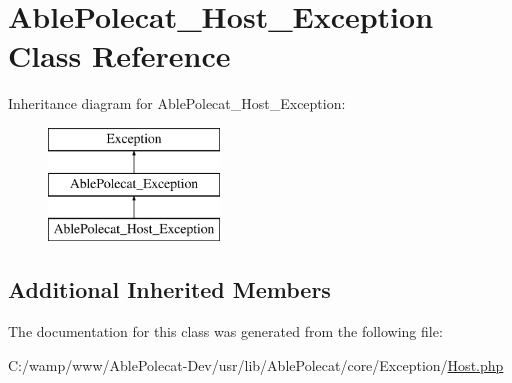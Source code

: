 \hypertarget{class_able_polecat___host___exception}{}\section{Able\+Polecat\+\_\+\+Host\+\_\+\+Exception Class Reference}
\label{class_able_polecat___host___exception}
Inheritance diagram for Able\+Polecat\+\_\+\+Host\+\_\+\+Exception\+:\begin{figure}[H]
\begin{center}
\leavevmode
\includegraphics[height=3.000000cm]{class_able_polecat___host___exception}
\end{center}
\end{figure}
\subsection*{Additional Inherited Members}


The documentation for this class was generated from the following file\+:\begin{DoxyCompactItemize}
\item 
C\+:/wamp/www/\+Able\+Polecat-\/\+Dev/usr/lib/\+Able\+Polecat/core/\+Exception/\hyperlink{_exception_2_host_8php}{Host.\+php}\end{DoxyCompactItemize}

